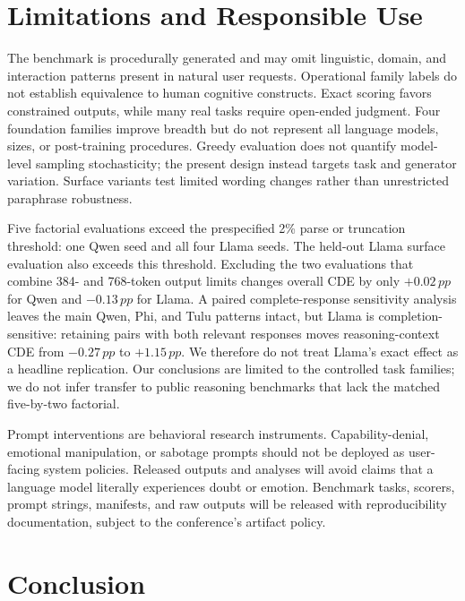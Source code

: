 \documentclass[sigconf]{acmart}
\newcommand{\pp}{\,pp}
\newcommand{\revision}[1]{\textcolor{revisionred}{#1}}
\begin{document}
\section{Limitations and Responsible Use}

The benchmark is procedurally generated and may omit linguistic, domain, and
interaction patterns present in natural user requests. Operational family
labels do not establish equivalence to human cognitive constructs. Exact
scoring favors constrained outputs, while many real tasks require open-ended
judgment. Four foundation families improve breadth but do not represent all
language models, sizes, or post-training procedures. Greedy evaluation does
not quantify model-level sampling stochasticity; the present design instead
targets task and generator variation. Surface variants test limited wording
changes rather than unrestricted paraphrase robustness.

\revision{Five factorial evaluations exceed the prespecified 2\% parse or
truncation threshold: one Qwen seed and all four Llama seeds. The held-out
Llama surface evaluation also exceeds this threshold. Excluding the two
evaluations that combine 384- and 768-token output limits changes overall CDE
by only $+0.02\pp$ for Qwen and $-0.13\pp$ for Llama. A paired
complete-response sensitivity analysis leaves the main Qwen, Phi, and Tulu
patterns intact, but Llama is completion-sensitive: retaining pairs with both
relevant responses moves reasoning-context CDE from $-0.27\pp$ to
$+1.15\pp$. We therefore do not treat Llama's exact effect as a headline
replication. Our conclusions are limited to the controlled task families; we
do not infer transfer to public reasoning benchmarks that lack the matched
five-by-two factorial.}

Prompt interventions are behavioral research instruments. Capability-denial,
emotional manipulation, or sabotage prompts should not be deployed as
user-facing system policies. Released outputs and analyses will avoid claims
that a language model literally experiences doubt or emotion. Benchmark tasks,
scorers, prompt strings, manifests, and raw outputs will be released with
reproducibility documentation, subject to the conference's artifact policy.

\section{Conclusion}
\end{document}
